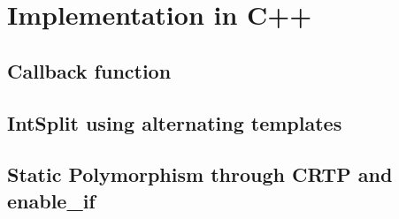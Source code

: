 





\clearemptydoublepage

\mbox{}
\vfill

\vfill
\tableofcontents

\clearpage

\listoffigures
\listofalgorithms

\clearemptydoublepage 
\clearpage 
\clearpage 
\clearpage 



\clearpage
\section{Implementation in C++}

\subsection{Callback function}
\subsection{IntSplit using alternating templates}
\subsection{Static Polymorphism through CRTP and enable\_if}

\begin{comment}
The main achievement is that the algorithms can be implemented in a stunningly simple way

and that they are stunningly similar to the pseudo-algorithms of section \ref{sec:propagators}
even though they rely on highly optimized C++ code
\cite{libwaveblocks}
What was the main challenge? What was controllable (which code could be changed), what not? 
Quick alternating o

The challenges were twofold: 
First, identifying of all the common basic building blocks and expressing all algorithms in terms of these components
Second, implementing all basic building blocks in a generic but efficient manner
Third, minimize the overhead for switching between function calls

 - encapsulate the functionality in a clean interface without loosing flexibility and 
 - write efficient/fast code

Tell how each of these challenges were overcome


Motivation of software design choices

	- Why class structure/inheritance (explain hierarchy)
	- CRTP / static polymorphism \cite{C_CRTP}
	- recognizing IP
	- callback function
	- implementation of IntSplit (TU,UT, partial specialization)
	- polymorphism through enable-if




\clearpage
\end{comment}
